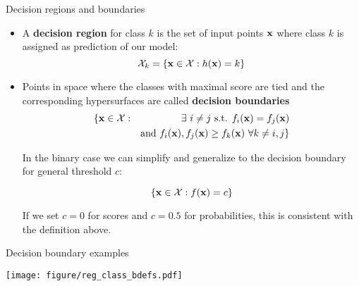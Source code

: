 \documentclass[11pt,compress,t,notes=noshow, xcolor=table]{beamer}
\begin{document}
\begin{vbframe}{Decision regions and boundaries}
\begin{itemize}
  \item A \textbf{decision region} for class $k$ is the set of input points $\xv$ where class $k$ is assigned as prediction of our model:
$$
\Xspace_k = \{\xv \in \Xspace : \hx = k\}
$$

\item Points in space where the classes with maximal score are tied and the corresponding hypersurfaces are called \textbf{decision boundaries}
\begin{eqnarray*}  
\{ \xv \in \Xspace: && \exists~i \ne j \text{ s.t. } \fkx[i] = \fkx[j] \\ && \text{and } \fkx[i], \fkx[j] \ge \fkx[k] ~ \forall k \ne i, j\}
\end{eqnarray*}  

In the binary case we can simplify and generalize to the decision boundary for general threshold $c$:

$$
    \{ \xv \in \Xspace : \fx = c \}
$$

If we set $c=0$ for scores and $c=0.5$ for probabilities, this is consistent with the definition above.

\end{itemize}
\end{vbframe} 


\begin{vbframe}{Decision boundary examples}

\begin{knitrout}\scriptsize
{}\color{fgcolor}

{\centering \texttt{[image: figure/reg\_class\_bdefs.pdf]} 

}



\end{knitrout}

\end{vbframe}
\end{document}
